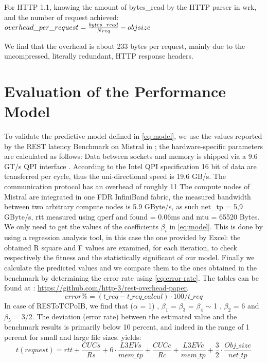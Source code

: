 \documentclass[runningheads]{llncs}
\begin{document}
For HTTP 1.1, knowing the amount of bytes\_read by the HTTP parser in wrk, and the number of request achieved:
$ overhead\_per\_request=\frac{bytes\_read}{Nreq} - obj\-size $

We find that the overhead is about 233 bytes per request, mainly due to the uncompressed, literally redundant, HTTP response headers.
\section{Evaluation of the Performance Model} \label{sec:evaluation}
To validate the predictive model defined in \cref{eq:model}, we use the values reported by the REST latency Benchmark on Mistral in ; the hardware-specific parameters are calculated as follows:
Data between sockets and memory is shipped via a 9.6 GT/s QPI interface \cite{intel-xeon}. According to the Intel QPI specification \cite{intel-qpi} 16 bit of data are transferred per cycle, thus the uni-directional speed is 19,6 GB/s. The communication protocol has an overhead of roughly 11 %
The compute nodes of Mistral are integrated in one FDR InfiniBand fabric, the measured bandwidth between two arbitrary compute nodes is 5.9 GByte/s, as such net\_tp = 5,9 GByte/s, rtt measured using qperf and found = 0.06ms and mtu = 65520 Bytes.
We only need to get the values of the coefficients $\beta_i$ in \cref{eq:model}. This is done by using a regression analysis tool, in this case the one provided by Excel: the obtained R square and F values are examined, for each iteration, to check respectively the fitness and the statistically significant of our model. Finally we calculate the predicted values and we compare them to the ones obtained in the benchmark by determining the error rate using \cref{eq:error-rate}. The tables can be found at : \href{https://github.com/http-3/rest-overhead-paper}{https://github.com/http-3/rest-overhead-paper}.
\begin{equation}
 error\%=(t\_req -t\_req\_calcul)\cdot100/t\_req
\label{eq:error-rate}
\end{equation}
In case of RESToTCPoIB, we find that ($\alpha$ = 1) , $\beta_1$ = $\beta_3$ = $\beta_4$ $\sim$ 1 , $\beta_2$ = 6 and $\beta_5$ = 3/2.
The deviation (error rate) between the estimated value and the benchmark results is primarily below 10 percent, and indeed in the range of 1 percent for small and large file sizes. yields:
\begin{equation}
\label{eq:model-rest}
t(request)=rtt+\frac{CUCs}{Rs}+6\cdot\frac{L3EVs}{mem\_tp}+\frac{CUCc}{Rc}+\frac{L3EVc}{mem\_tp}+\frac{3}{2}\cdot\frac{Obj\_size}{net\_tp}
\end{equation}
\end{document}
